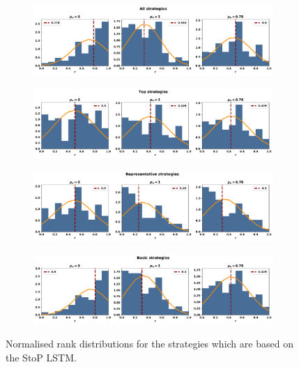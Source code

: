 \begin{figure}[!htbp]
    \begin{subfigure}{\textwidth}
    \includegraphics[width=\textwidth]{src/chapters/07/img/normalised_rank_classification_all_strategies.pdf}
    \end{subfigure}
    \par\bigskip
    \begin{subfigure}{\textwidth}
    \includegraphics[width=\textwidth]{src/chapters/07/img/normalised_rank_classification_top_strategies.pdf}
    \end{subfigure}
    \par\bigskip
    \begin{subfigure}{\textwidth}
    \includegraphics[width=\textwidth]{src/chapters/07/img/normalised_rank_classification_representative_strategies.pdf}
    \end{subfigure}
    \par\bigskip
    \begin{subfigure}{\textwidth}
    \includegraphics[width=\textwidth]{src/chapters/07/img/normalised_rank_classification_basic_strategies.pdf}
    \end{subfigure}
    \caption{Normalised rank distributions for the strategies which are based on the StoP
    LSTM.}\label{fig:normalised_rank_distributions_sequence_to_probability}
\end{figure}

